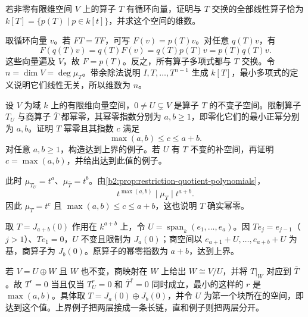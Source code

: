 \begin{exercise}\label{b2:ex:01-cyclic-centralizer}
	若非零有限维空间 \(V\) 上的算子 \(T\) 有循环向量，证明与 \(T\) 交换的全部线性算子恰为 \(k[T]=\{p(T)\mid p\in k[t]\}\)，并求这个空间的维数。
\end{exercise}
\begin{solution}
	取循环向量 \(v\)。若 \(FT=TF\)，可写 \(F(v)=p(T)v\)。对任意 \(q(T)v\)，有
	\[
		F(q(T)v)=q(T)F(v)=q(T)p(T)v=p(T)q(T)v.
	\]
	这些向量遍及 \(V\)，故 \(F=p(T)\)。反之，所有算子多项式都与 \(T\) 交换。令 \(n=\dim V=\deg \mu_T\)。带余除法说明 \(I,T,\ldots,T^{n-1}\) 生成 \(k[T]\)，最小多项式的定义说明它们线性无关，所以维数为 \(n\)。
\end{solution}

\begin{exercise}\label{b2:ex:01-restriction-quotient-polynomials}
	设 \(V\) 为域 \(k\) 上的有限维向量空间，\(0\ne U\subsetneq V\) 是算子 \(T\) 的不变子空间。限制算子 \(T_U\) 与商算子 \(\bar T\) 都幂零，其幂零指数分别为 \(a,b\ge1\)，即零化它们的最小正幂分别为 \(a,b\)。证明 \(T\) 幂零且其指数 \(c\) 满足
	\[
		\max(a,b)\le c\le a+b.
	\]
	对任意 \(a,b\ge1\)，构造达到上界的例子。若 \(U\) 有 \(T\) 不变的补空间，再证明 \(c=\max(a,b)\)，并给出达到此值的例子。
\end{exercise}
\begin{solution}
	此时 \(\mu_{T_U}=t^a\)、\(\mu_{\bar T}=t^b\)。由\cref{b2:prop:restriction-quotient-polynomials}，
	\[
		t^{\max(a,b)}\mid \mu_T\mid t^{a+b}.
	\]
	因此 \(\mu_T=t^c\) 且 \(\max(a,b)\le c\le a+b\)，这也说明 \(T\) 确实幂零。

	取 \(T=J_{a+b}(0)\) 作用在 \(k^{a+b}\) 上，令 \(U=\operatorname{span}_k(e_1,\ldots,e_a)\)。因 \(Te_j=e_{j-1}\)（\(j>1\)）、\(Te_1=0\)，\(U\) 不变且限制为 \(J_a(0)\)；商空间以 \(e_{a+1}+U,\ldots,e_{a+b}+U\) 为基，商算子为 \(J_b(0)\)。原算子的幂零指数为 \(a+b\)，达到上界。

	若 \(V=U\oplus W\) 且 \(W\) 也不变，商映射在 \(W\) 上给出 \(W\cong V/U\)，并将 \(T|_W\) 对应到 \(\bar T\)。故 \(T^r=0\) 当且仅当 \(T_U^r=0\) 和 \(\bar T^r=0\) 同时成立，最小的这样的 \(r\) 是 \(\max(a,b)\)。具体取 \(T=J_a(0)\oplus J_b(0)\)，并令 \(U\) 为第一个块所在的空间，即达到这个值。上界例子把两层接成一条长链，直和例子则把两层分开。
\end{solution}

